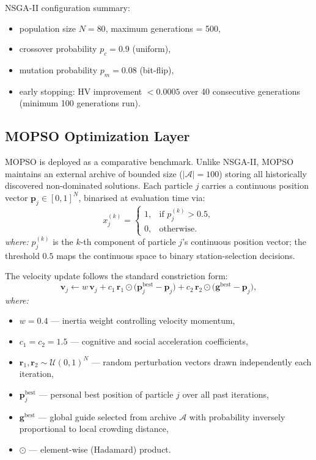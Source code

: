 \noindent
NSGA-II configuration summary:
\begin{itemize}
    \item population size $N = 80$, maximum generations = 500,
    \item crossover probability $p_c = 0.9$ (uniform),
    \item mutation probability $p_m = 0.08$ (bit-flip),
    \item early stopping: HV improvement $< 0.0005$ over 40
          consecutive generations (minimum 100 generations run).
\end{itemize}

\subsection{MOPSO Optimization Layer}
\label{sec:mopso_layer}

MOPSO is deployed as a comparative benchmark. Unlike NSGA-II, MOPSO
maintains an external archive of bounded size ($|\mathcal{A}| = 100$)
storing all historically discovered non-dominated solutions. Each
particle $j$ carries a continuous position vector
$\mathbf{p}_j \in [0,1]^N$, binarised at evaluation time via:
\begin{equation}
x_j^{(k)} =
\begin{cases}
1, & \text{if } p_j^{(k)} > 0.5,\\
0, & \text{otherwise.}
\end{cases}
\label{eq:binarise}
\end{equation}
\textit{where:} $p_j^{(k)}$ is the $k$-th component of particle $j$'s
continuous position vector; the threshold $0.5$ maps the continuous space
to binary station-selection decisions.

\medskip\noindent
The velocity update follows the standard constriction form:
\begin{equation}
\mathbf{v}_j \leftarrow
w\,\mathbf{v}_j
+ c_1\,\mathbf{r}_1 \odot
  \bigl(\mathbf{p}_j^{\mathrm{best}} - \mathbf{p}_j\bigr)
+ c_2\,\mathbf{r}_2 \odot
  \bigl(\mathbf{g}^{\mathrm{best}} - \mathbf{p}_j\bigr),
\label{eq:velocity}
\end{equation}
\textit{where:}
\begin{itemize}
  \item $w = 0.4$ — inertia weight controlling velocity momentum,
  \item $c_1 = c_2 = 1.5$ — cognitive and social acceleration
        coefficients,
  \item $\mathbf{r}_1,\mathbf{r}_2 \sim \mathcal{U}(0,1)^N$ — random
        perturbation vectors drawn independently each iteration,
  \item $\mathbf{p}_j^{\mathrm{best}}$ — personal best position of
        particle $j$ over all past iterations,
  \item $\mathbf{g}^{\mathrm{best}}$ — global guide selected from archive
        $\mathcal{A}$ with probability inversely proportional to local
        crowding distance,
  \item $\odot$ — element-wise (Hadamard) product.
\end{itemize}

